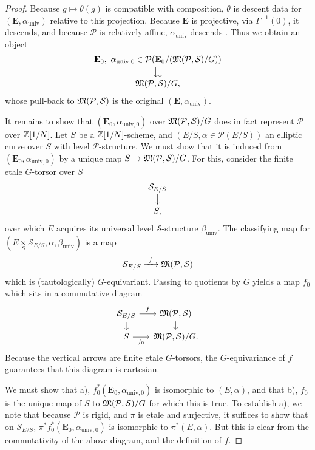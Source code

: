 \begin{proof}
Because $g \mapsto \theta(g)$ is compatible with composition, $\theta$ is descent data for $(\mathbf{E}, \alpha_{\mathrm{univ}})$ relative to this projection. Because $\mathbf{E}$ is projective, via $\Gamma^{-1}(0)$, it descends, and because $\mathcal{P}$ is relatively affine, $\alpha_{\mathrm{univ}}$ descends \cite[I, Exp.~VIII, 7.8, 1.2 and 1.7]{SGA}. Thus we obtain an object
\[
\begin{array}{@{}c@{}}
\mathbf{E}_0,\ \alpha_{\mathrm{univ},0} \in \mathcal{P}(\mathbf{E}_0/(\Mfrak(\mathcal{P}, \mathcal{S})/G)) \\[2pt]
\big\downarrow\!\big\downarrow \\[2pt]
\Mfrak(\mathcal{P}, \mathcal{S})/G,
\end{array}
\]
whose pull-back to $\mathfrak{M}(\mathcal{P}, \mathcal{S})$ is the original $(\mathbf{E}, \alpha_{\mathrm{univ}})$.

It remains to show that $(\mathbf{E}_0, \alpha_{\mathrm{univ},0})$ over $\mathfrak{M}(\mathcal{P}, \mathcal{S})/G$ does in fact represent $\mathcal{P}$ over $\mathbb{Z}[1/N]$. Let $S$ be a $\mathbb{Z}[1/N]$-scheme, and $(E/S, \alpha \in \mathcal{P}(E/S))$ an elliptic curve over $S$ with level $\mathcal{P}$-structure. We must show that it is induced from $(\mathbf{E}_0, \alpha_{\mathrm{univ},0})$ by a unique map $S \to \mathfrak{M}(\mathcal{P}, \mathcal{S})/G$. For this, consider the finite etale $G$-torsor over $S$
\[
\begin{array}{@{}c@{}}
\mathcal{S}_{E/S} \\[2pt]
\big\downarrow \\[2pt]
S,
\end{array}
\]
over which $E$ acquires its universal level $\mathcal{S}$-structure $\beta_{\mathrm{univ}}$. The classifying map for $(E \underset{S}{\times} \mathcal{S}_{E/S}, \alpha, \beta_{\mathrm{univ}})$ is a map
\[
\mathcal{S}_{E/S} \xrightarrow{\ f\ } \Mfrak(\mathcal{P}, \mathcal{S})
\]
which is (tautologically) $G$-equivariant. Passing to quotients by $G$ yields a map $f_0$ which sits in a commutative diagram
\[
\begin{tikzcd}[column sep=small, row sep=small]
\mathcal{S}_{E/S} \arrow[r, "f"] \arrow[d] & \Mfrak(\mathcal{P}, \mathcal{S}) \arrow[d] \\
S \arrow[r, "f_0"'] & \Mfrak(\mathcal{P}, \mathcal{S})/G.
\end{tikzcd}
\]
Because the vertical arrows are finite etale $G$-torsors, the $G$-equivariance of $f$ guarantees that this diagram is cartesian.

We must show that a), $f_0^*(\mathbf{E}_0, \alpha_{\mathrm{univ},0})$ is isomorphic to $(E, \alpha)$, and that b), $f_0$ is the unique map of $S$ to $\mathfrak{M}(\mathcal{P}, \mathcal{S})/G$ for which this is true. To establish a), we note that because $\mathcal{P}$ is rigid, and $\pi$ is etale and surjective, it suffices to show that on $\mathcal{S}_{E/S}$, $\pi^*f_0^*(\mathbf{E}_0, \alpha_{\mathrm{univ},0})$ is isomorphic to $\pi^*(E, \alpha)$. But this is clear from the commutativity of the above diagram, and the definition of $f$.


\end{proof}
